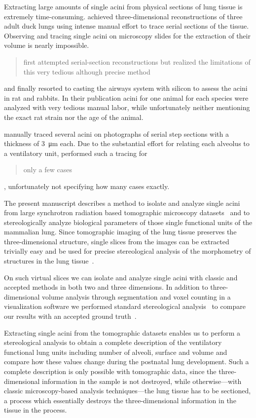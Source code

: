 \documentclass[a4paper,DIVcalc,abstract,english]{scrartcl}
\begin{document}
Extracting large amounts of single acini from physical sections of lung tissue is extremely time-consuming.
\citet{Woodward2005} achieved three-dimensional reconstructions of three adult duck lungs using intense manual effort to trace serial sections of the tissue.
Observing and tracing single acini on microscopy slides for the extraction of their volume is nearly impossible.
\citet{Rodriguez1987} \blockquote{first attempted serial-section reconstructions but realized the limitations of this very tedious although precise method} and finally resorted to casting the airways system with silicon to assess the acini in rat and rabbits.
In their publication acini for one animal for each species were analyzed with very tedious manual labor, while unfortunately neither mentioning the exact rat strain nor the age of the animal.

\citet{Mercer1987a} manually traced several acini on photographs of serial step sections with a thickness of \SI{3}{\micro\meter} each.
Due to the substantial effort for relating each alveolus to a ventilatory unit, \citeauthor{Mercer1987a} performed such a tracing for \blockquote{only a few cases}, unfortunately not specifying how many cases exactly.

The present manuscript describes a method to isolate and analyze single acini from large synchrotron radiation based tomographic microscopy datasets~\cite{Haberthuer2010a} and to stereologically analyze biological parameters of those single functional units of the mammalian lung.
Since tomographic imaging of the lung tissue preserves the three-dimensional structure, single slices from the images can be extracted trivially easy and be used for precise stereological analysis of the morphometry of structures in the lung tissue~\cite{Hsia2010}.

On such virtual slices we can isolate and analyze single acini with classic and accepted methods in both two and three dimensions.
In addition to three-dimensional volume analysis through segmentation and voxel counting in a visualization software we performed standard stereological analysis~\cite{Hsia2010} to compare our results with an accepted ground truth~\cite{Rodriguez1987,Tschanz2003}.

Extracting single acini from the tomographic datasets enables us to perform a stereological analysis to obtain a complete description of the ventilatory functional lung units including number of alveoli, surface and volume and compare how these values change during the postnatal lung development.
Such a complete description is only possible with tomographic data, since the three-dimensional information in the sample is not destroyed, while otherwise---with classic microscopy-based analysis techniques---the lung tissue has to be sectioned, a process which essentially destroys the three-dimensional information in the tissue in the process.
\end{document}
